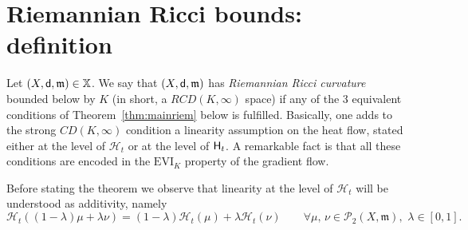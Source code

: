 \documentclass[reqno,11pt]{article}
\numberwithin{equation}{section}
\newcommand{\mm}{{\mbox{\boldmath$m$}}}
\newcommand{\sfd}{{\sf d}}
\newcommand{\EVI}[4]{\mathrm{EVI}_{#4}(#1,{#2}_W,#3)}
\newcommand{\ProbabilitiesTwo}[1]{\mathscr P_2(#1)}     %
\newcommand{\probt}{\ProbabilitiesTwo}
\newcommand{\X}{\mathbb X}
\newcommand{\rcd}[2]{RCD(#1,#2)}
\newcommand{\heatl}{{\sf H}}
\newcommand{\heatw}{{\mathscr H}}
\renewcommand{\EVI}{\ensuremath{\mathrm{EVI}}}
\renewcommand{\mm}{\mathfrak m}
\begin{document}
\section{Riemannian Ricci bounds: definition}\label{sec:rcd}

Let $(X,\sfd,\mm)\in\X$. We say that $(X,\sfd,\mm)$ has
\emph{Riemannian Ricci curvature} bounded below by $K$ (in short, a
$\rcd K\infty$ space) if any of the 3 equivalent conditions of
Theorem~\ref{thm:mainriem} below is fulfilled. Basically, one adds
to the strong $CD(K,\infty)$ condition a linearity assumption on the
heat flow, stated either at the level of $\heatw_t$ or at the level
of $\heatl_t$. A remarkable fact is that all these conditions are
encoded in the $\EVI_K$ property of the gradient flow.

Before stating the theorem we observe that linearity at the level of
$\heatw_t$ will be understood as additivity, namely
$$
\heatw_t((1-\lambda)\mu+\lambda\nu)=(1-\lambda)\heatw_t(\mu)+\lambda\heatw_t(\nu)
\qquad\forall \mu,\,\nu\in\probt {X,\mm},\,\,\lambda\in [0,1].
$$
\end{document}
